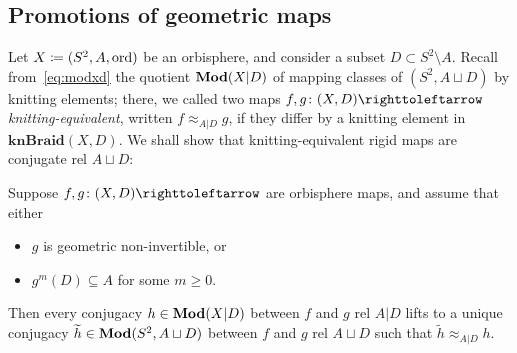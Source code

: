 \documentclass{amsart}
\newcommand\knBraid{{\mathbf{knBraid}}}
\begin{document}
\subsection{Promotions of geometric maps}
Let $X\coloneqq(S^2,A,\operatorname{ord})$ be an orbisphere, and consider a subset
$D\subset S^2\setminus A$. Recall from~\eqref{eq:modxd} the quotient
$\mathbf{\relax Mod}(X|D)$ of mapping classes of $(S^2,A\sqcup D)$ by knitting
elements; there, we called two maps $f,g\colon(X,D)\selfmap$
\emph{knitting-equivalent}, written $f\approx_{A|D}g$, if they differ
by a knitting element in $\knBraid(X,D)$. We shall show that
knitting-equivalent rigid maps are conjugate rel $A\sqcup D$:
\begin{thm}[Promotion]
\label{thm:promotion}
  Suppose $f,g\colon(X,D)\selfmap$ are orbisphere maps, and
  assume that either
  \begin{itemize}
  \item $g$ is geometric non-invertible, or
  \item $g^m(D)\subseteq A$ for some $m\ge 0$.
  \end{itemize}
  Then every conjugacy $h\in\mathbf{\relax Mod}(X|D)$ between $f$ and $g$ rel $A|D$
  lifts to a unique conjugacy $\widetilde h\in\mathbf{\relax Mod}(S^2,A\sqcup D)$
  between $f$ and $g$ rel $A\sqcup D$ such that
  $\widetilde h \approx_{A|D}h$.
\end{thm}
\end{document}
